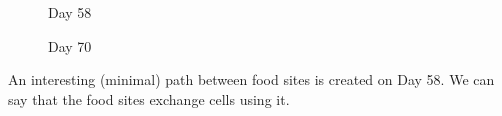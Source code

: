 \documentclass[a4paper,prd,twocolumn,nofootinbib,superscriptaddress,floatfix]{revtex4}
\begin{document}
\begin{figure}[H] 
\centering

    \caption{Day 58} 
    \label{fig7:a} 
    \vspace{4ex}

  
    \caption{Day 70} 
    \label{fig7:c} 

  
 
  \label{fig:7} 
\end{figure}

An interesting (minimal) path between food sites is created on Day 58. We can say that the food sites exchange cells using it.
\end{document}
